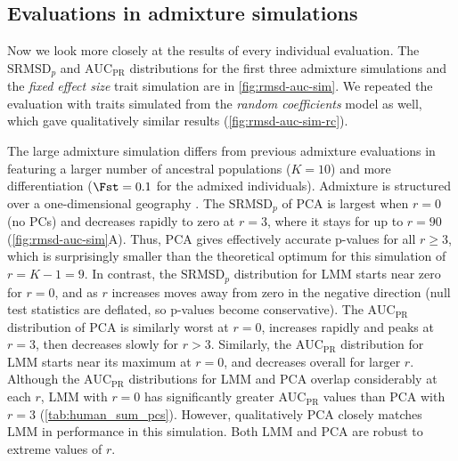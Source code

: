 \documentclass[11pt]{article}
\newcommand{\rmsd}{\text{SRMSD}_p}
\newcommand{\auc}{\text{AUC}_\text{PR}}
\begin{document}
\subsection{Evaluations in admixture simulations}

Now we look more closely at the results of every individual evaluation.
The $\rmsd$ and $\auc$ distributions for the first three admixture simulations and the \textit{fixed effect size} trait simulation are in \cref{fig:rmsd-auc-sim}.
We repeated the evaluation with traits simulated from the \textit{random coefficients} model as well, which gave qualitatively similar results (\cref{fig:rmsd-auc-sim-rc}).

The large admixture simulation differs from previous admixture evaluations in featuring a larger number of ancestral populations ($K=10$) and more differentiation ($\Fst = 0.1$ for the admixed individuals).
Admixture is structured over a one-dimensional geography \citep{ochoa_estimating_2021}.
The $\rmsd$ of PCA is largest when $r=0$ (no PCs) and decreases rapidly to zero at $r=3$, where it stays for up to $r=90$ (\cref{fig:rmsd-auc-sim}A).
Thus, PCA gives effectively accurate p-values for all $r \ge 3$, which is surprisingly smaller than the theoretical optimum for this simulation of $r = K - 1 = 9$.
In contrast, the $\rmsd$ distribution for LMM starts near zero for $r=0$, and as $r$ increases moves away from zero in the negative direction (null test statistics are deflated, so p-values become conservative).
The $\auc$ distribution of PCA is similarly worst at $r=0$, increases rapidly and peaks at $r = 3$, then decreases slowly for $r > 3$.
Similarly, the $\auc$ distribution for LMM starts near its maximum at $r=0$, and decreases overall for larger $r$.
Although the $\auc$ distributions for LMM and PCA overlap considerably at each $r$, LMM with $r=0$ has significantly greater $\auc$ values than PCA with $r=3$ (\cref{tab:human_sum_pcs}).
However, qualitatively PCA closely matches LMM in performance in this simulation.
Both LMM and PCA are robust to extreme values of $r$.
\end{document}
